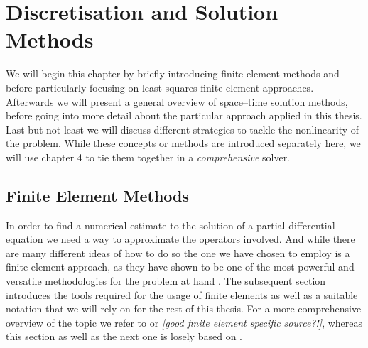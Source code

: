 \documentclass[../draft_1.tex]{subfiles}
\begin{document}
\chapter{Discretisation and Solution Methods}

We will begin this chapter by briefly introducing finite element methods and before particularly focusing on least squares finite element approaches. Afterwards we will present a general overview of space--time solution methods, before going into more detail about the particular approach applied in this thesis. Last but not least we will discuss different strategies to tackle the nonlinearity of the problem. While these concepts or methods are introduced separately here, we will use chapter 4 to tie them together in a \textit{comprehensive} solver.


\section{Finite Element Methods}

In order to find a numerical estimate to the solution of a partial differential equation we need a way to approximate the operators involved. And while there are many different ideas of how to do so the one we have chosen to employ is a finite element approach, as they have shown to be one of the most powerful and versatile methodologies for the problem at hand \cite{bochev2009least}. The subsequent section introduces the tools required for the usage of finite elements as well as a suitable notation that we will rely on for the rest of this thesis. For a more comprehensive overview of the topic we refer to \cite{evans2010partial} or \textit{[good finite element specific source?!]}, whereas this section as well as the next one is losely based on \cite{bochev2009least}.


\end{document}
